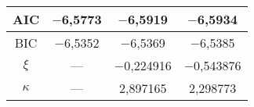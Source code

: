 \begin{multicols}{2}
\begin{table*}[b]
\begin{minipage}[t]{80mm}
\begin{center}
{\begin{tabular}{|c|c|c|c|}
\hline
AIC&$-$6,5773&$-$6,5919&$-$6,5934\\
\hline
BIC&$-$6,5352&$-$6,5369&$-$6,5385\\
\hline
$\xi$&---&$-$0,224916&$-$0,543876\\
\hline
$\kappa$&---&2,897165&2,298773\\
\hline
\end{tabular}
}
\end{center}
\end{minipage}
\hfill
\begin{minipage}[t]{80mm}
\begin{center}
{\small 
{}
\vspace*{2ex}

}
\end{center}
\end{minipage}
\end{table*}
\end{multicols}
